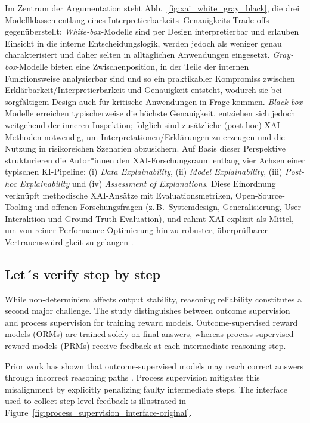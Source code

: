 Im Zentrum der Argumentation steht Abb.~\ref{fig:xai_white_gray_black}, die drei Modellklassen entlang eines Interpretierbarkeits--Genauigkeits-Trade-offs gegenüberstellt: \emph{White-box}-Modelle sind per Design interpretierbar und erlauben Einsicht in die interne Entscheidungslogik, werden jedoch als weniger genau charakterisiert und daher selten in alltäglichen Anwendungen eingesetzt. \emph{Gray-box}-Modelle bieten eine Zwischenposition, in der Teile der internen Funktionsweise analysierbar sind und so ein praktikabler Kompromiss zwischen Erklärbarkeit/Interpretierbarkeit und Genauigkeit entsteht, wodurch sie bei sorgfältigem Design auch für kritische Anwendungen in Frage kommen. \emph{Black-box}-Modelle erreichen typischerweise die höchste Genauigkeit, entziehen sich jedoch weitgehend der inneren Inspektion; folglich sind zusätzliche (post-hoc) XAI-Methoden notwendig, um Interpretationen/Erklärungen zu erzeugen und die Nutzung in risikoreichen Szenarien abzusichern. 
Auf Basis dieser Perspektive strukturieren die Autor*innen den XAI-Forschungsraum entlang vier Achsen einer typischen KI-Pipeline: (i) \emph{Data Explainability}, (ii) \emph{Model Explainability}, (iii) \emph{Post-hoc Explainability} und (iv) \emph{Assessment of Explanations}. Diese Einordnung verknüpft methodische XAI-Ansätze mit Evaluationsmetriken, Open-Source-Tooling und offenen Forschungsfragen (z.\,B.\ Systemdesign, Generalisierung, User-Interaktion und Ground-Truth-Evaluation), und rahmt XAI explizit als Mittel, um von reiner Performance-Optimierung hin zu robuster, überprüfbarer Vertrauenswürdigkeit zu gelangen \cite{ali2023xai_trustworthy}.

\subsection{Let´s verify step by step}
\label{subsec:process-supervision-original}

While non-determinism affects output stability, reasoning reliability constitutes a second major challenge.
The study \cite{lets_verify_step_by_step} distinguishes between outcome supervision and process supervision for training reward models.
Outcome-supervised reward models (ORMs) are trained solely on final answers, whereas process-supervised reward models (PRMs) receive feedback at each intermediate reasoning step.

Prior work has shown that outcome-supervised models may reach correct answers through incorrect reasoning paths \cite{lets_verify_step_by_step}.
Process supervision mitigates this misalignment by explicitly penalizing faulty intermediate steps.
The interface used to collect step-level feedback is illustrated in Figure~\ref{fig:process_supervision_interface-original}.

